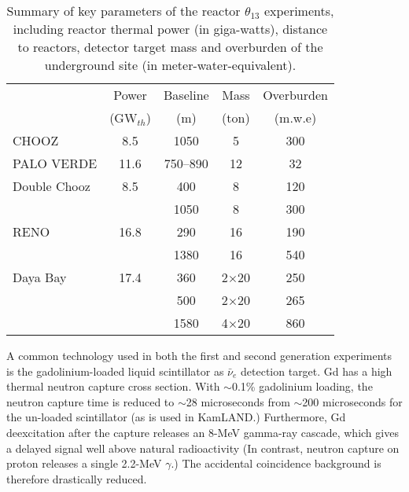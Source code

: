 \begin{table}[!htb]
  \begin{tabular}{lcccc}
  \hline
  & Power & Baseline & Mass & Overburden \\
  & (GW$_{th}$) & (m) & (ton) & (m.w.e)    \\
  \hline
  CHOOZ        & 8.5  & 1050  & 5    & 300\\
  PALO VERDE   & 11.6 & 750--890  & 12  & 32\\
  \hline
  Double Chooz & 8.5  & 400  & 8  & 120\\
               &      & 1050 & 8  & 300\\
  RENO         & 16.8 & 290  & 16   & 190\\
               &      & 1380 & 16   & 540\\
  Daya Bay     & 17.4 & 360  & 2$\times$20   & 250\\
               &      & 500  & 2$\times$20   & 265\\
               &      & 1580 & 4$\times$20   & 860\\
  \hline
  \end{tabular}
  \caption{Summary of key parameters of the reactor $\theta_{13}$ experiments, including reactor thermal power (in giga-watts), distance to reactors, detector target mass and overburden of the underground site (in meter-water-equivalent).}
\label{tab:theta13}
\end{table}

A common technology used in both the first and second generation experiments is the gadolinium-loaded liquid scintillator as $\bar\nu_{e}$ detection target. Gd has a high thermal neutron capture cross section. With $\sim$0.1\% gadolinium loading, the neutron capture time is reduced to $\sim$28 microseconds from $\sim$200 microseconds for the un-loaded scintillator (as is used in KamLAND.) Furthermore, Gd deexcitation after the capture releases an 8-MeV gamma-ray cascade, which gives a delayed signal well above natural radioactivity (In contrast, neutron capture on proton releases a single 2.2-MeV $\gamma$.) The accidental coincidence background is therefore drastically reduced.

